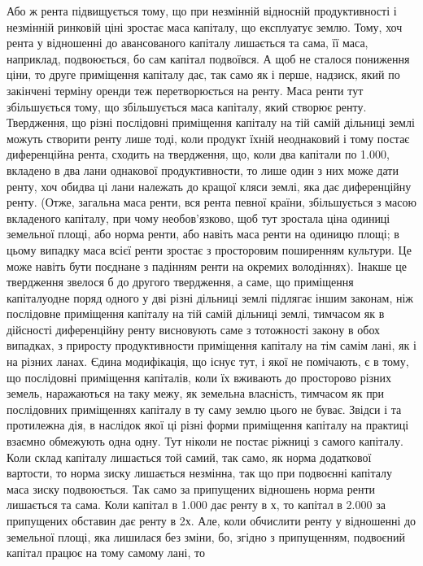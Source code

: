 Або ж рента підвищується тому, що при незмінній відносній продуктивності
і незмінній ринковій ціні зростає маса капіталу, що експлуатує землю.
Тому, хоч рента у відношенні до авансованого капіталу лишається та сама, її
маса, наприклад, подвоюється, бо сам капітал подвоївся. А щоб не сталося
пониження ціни, то друге приміщення капіталу дає, так само як і перше,
надзиск, який по закінчені терміну оренди теж перетворюється на ренту. Маса
ренти тут збільшується тому, що збільшується маса капіталу, який створює
ренту. Твердження, що різні послідовні приміщення капіталу на тій самій дільниці
землі можуть створити ренту лише тоді, коли продукт їхній неоднаковий
і тому постає диференційна рента, сходить на твердження, що, коли два капітали
по \num{1.000}, вкладено в два лани однакової продуктивности, то
лише один з них може дати ренту, хоч обидва ці лани належать до кращої
кляси землі, яка дає диференційну ренту. (Отже, загальна маса ренти, вся
рента певної країни, збільшується з масою вкладеного капіталу, при чому
необов’язково, щоб тут зростала ціна одиниці земельної площі, або норма
ренти, або навіть маса ренти на одиницю площі; в цьому випадку маса
всієї ренти зростає з просторовим поширенням культури. Це може навіть
бути поєднане з падінням ренти на окремих володіннях). Інакше це твердження
звелося б до другого твердження, а саме, що приміщення капіталуодне
поряд одного у дві різні дільниці землі підлягає іншим законам, ніж послідовне
приміщення капіталу на тій самій дільниці землі, тимчасом як в дійсності
диференційну ренту висновують саме з тотожності закону в обох випадках,
з приросту продуктивности приміщення капіталу на тім самім лані, як і на
різних ланах. Єдина модифікація, що існує тут, і якої не помічають, є в тому,
що послідовні приміщення капіталів, коли їх вживають до просторово різних
земель, наражаються на таку межу, як земельна власність, тимчасом як при послідовних
приміщеннях капіталу в ту саму землю цього не буває. Звідси і та
протилежна дія, в наслідок якої ці різні форми приміщення капіталу на практиці
взаємно обмежують одна одну. Тут ніколи не постає ріжниці з самого капіталу.
Коли склад капіталу лишається той самий, так само, як норма додаткової
вартости, то норма зиску лишається незмінна, так що при подвоєнні
капіталу маса зиску подвоюється. Так само за припущених відношень норма
ренти лишається та сама. Коли капітал в \num{1.000} дає ренту в х, то
капітал в \num{2.000} за припущених обставин дає ренту в 2х. Але, коли
обчислити ренту у відношенні до земельної площі, яка лишилася без зміни, бо,
згідно з припущенням, подвоєний капітал працює на тому самому лані, то
\parbreak{}  %
